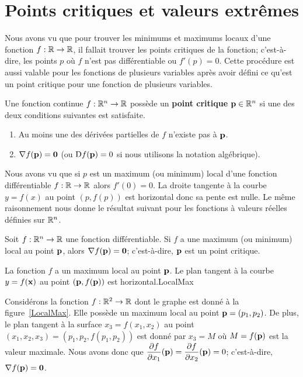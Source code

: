 {\section{Points critiques et valeurs extrêmes \eng}

Nous avons vu que pour trouver les minimums et maximums locaux d'une
fonction $f:\mathbb{R} \to \mathbb{R}$, il fallait trouver les points critiques de
la fonction; c'est-à-dire, les points $p$ où $f$ n'est pas
différentiable ou $f'(p) = 0$.  Cette procédure est
aussi valable pour les fonctions de plusieurs variables après avoir
défini ce qu'est un point critique pour une fonction de plusieurs
variables.

\begin{defn} 
Une fonction continue $f : \mathbb{R}^n \to \mathbb{R}$ possède un
{\bfseries point critique} $\mathbf{p} \in \mathbb{R}^n$ si une des deux
conditions suivantes est satisfaite.
\begin{enumerate}
\item Au moins une des dérivées partielles de $f$ n'existe pas à $\mathbf{p}$.
\item $\nabla f(\mathbf{p}) = \mathbf{0}$ (ou $\mathrm{D} f(\mathbf{p}) = 0$ si nous
utilisons la notation algébrique).
\end{enumerate}
\end{defn}

Nous avons vu que si $p$ est un maximum (ou minimum) local d'une fonction
différentiable $f:\mathbb{R} \to \mathbb{R}$ alors $f'(0) = 0$.  La droite tangente
à la courbe $y=f(x)$ au point $(p,f(p))$ est horizontal donc sa pente
est nulle.  Le même raisonnement nous donne le résultat suivant
pour les fonctions à valeurs réelles définies sur $\mathbb{R}^n$.

\begin{prop}
Soit $f : \mathbb{R}^n \to \mathbb{R}$ une fonction différentiable.  Si $f$ a une
maximum (ou minimum) local au point $\mathbf{p}$, alors
$\nabla f(\mathbf{p}) = \mathbf{0}$; c'est-à-dire, $\mathbf{p}$ est un point
critique.
\end{prop}

{La fonction $f$ a un maximum local au point $\mathbf{p}$.  Le plan tangent à
la courbe $y = f(\mathbf{x})$ au point $(\mathbf{p},f(\mathbf{p}))$ est
horizontal.}{LocalMax}

Considérons la fonction $f:\mathbb{R}^2 \to \mathbb{R}$ dont le graphe est donné à
la figure~\ref{LocalMax}.  Elle possède un maximum local au point
$\mathbf{p} = (p_1,p_2)$.  De plus, le plan tangent à la surface $x_3= f(x_1,x_2)$
au point $(x_1,x_2,x_3) = (p_1,p_2,f(p_1,p_2))$ est donné par
$x_3 = M$ où $M = f(\mathbf{p})$ est la valeur maximale.  Nous avons donc que
$\displaystyle \frac{\partial f}{\partial x_1}(\mathbf{p}) = \frac{\partial f}{\partial x_2}(\mathbf{p}) = 0$;
c'est-à-dire, $\nabla f(\mathbf{p}) = \mathbf{0}$.

}
